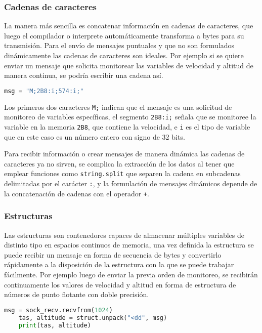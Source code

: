 \subsubsection{Cadenas de caracteres}

La manera más sencilla es concatenar información en cadenas de caracteres, que luego el compilador o interprete automáticamente transforma a bytes para su transmisión. Para el envío de mensajes puntuales y que no son formulados dinámicamente las cadenas de caracteres son ideales. Por ejemplo si se quiere enviar un mensaje que solicita monitorear las variables de velocidad y altitud de manera continua, se podría escribir una cadena así.

\begin{lstlisting}[language=Python]
	msg = "M;2B8:i;574:i;"
\end{lstlisting}

Los primeros dos caracteres \lstinline{M;} indican que el mensaje es una solicitud de monitoreo de variables específicas, el segmento \lstinline{2B8:i;} señala que se monitoree la variable en la memoria \lstinline{2B8}, que contiene la velocidad, e \lstinline{i} es el tipo de variable que en este caso es un número entero con signo de 32 bits.

Para recibir información o crear mensajes de manera dinámica las cadenas de caracteres ya no sirven, se complica la extracción de los datos al tener que emplear funciones como \lstinline{string.split} que separen la cadena en subcadenas delimitadas por el carácter \lstinline{:}, y la formulación de mensajes dinámicos depende de la concatenación de cadenas con el operador \lstinline{+}.

\subsubsection{Estructuras}

Las estructuras son contenedores capaces de almacenar múltiples variables de distinto tipo en espacios continuos de memoria, una vez definida la estructura se puede recibir un mensaje en forma de secuencia de bytes y convertirlo rápidamente a la disposición de la estructura con la que se puede trabajar fácilmente. Por ejemplo luego de enviar la previa orden de monitoreo, se recibirán continuamente los valores de velocidad y altitud en forma de estructura de números de punto flotante con doble precisión.

\begin{lstlisting}[language=Python]
	msg = sock_recv.recvfrom(1024)
	tas, altitude = struct.unpack("<dd", msg)
	print(tas, altitude)
\end{lstlisting}

